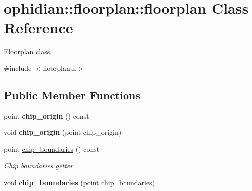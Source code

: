 \hypertarget{classophidian_1_1floorplan_1_1floorplan}{\section{ophidian\-:\-:floorplan\-:\-:floorplan Class Reference}
\label{classophidian_1_1floorplan_1_1floorplan}
}


Floorplan class.  




{\ttfamily \#include $<$floorplan.\-h$>$}

\subsection*{Public Member Functions}
\begin{DoxyCompactItemize}
\item 
\hypertarget{classophidian_1_1floorplan_1_1floorplan_ad44e227766842eacafce626a40ba06d8}{point {\bfseries chip\-\_\-origin} () const }\label{classophidian_1_1floorplan_1_1floorplan_ad44e227766842eacafce626a40ba06d8}

\item 
\hypertarget{classophidian_1_1floorplan_1_1floorplan_acad5b39db9aaae53a5c01b87faf8d571}{void {\bfseries chip\-\_\-origin} (point chip\-\_\-origin)}\label{classophidian_1_1floorplan_1_1floorplan_acad5b39db9aaae53a5c01b87faf8d571}

\item 
point \hyperlink{classophidian_1_1floorplan_1_1floorplan_a382fe697a6d6166b0cfb945de1f8ff70}{chip\-\_\-boundaries} () const 
\begin{DoxyCompactList}\small\item\em Chip boundaries getter. \end{DoxyCompactList}\item 
\hypertarget{classophidian_1_1floorplan_1_1floorplan_a802766d807b6eb9d4832e74b96d3551a}{void {\bfseries chip\-\_\-boundaries} (point chip\-\_\-boundaries)}\label{classophidian_1_1floorplan_1_1floorplan_a802766d807b6eb9d4832e74b96d3551a}


\end{DoxyCompactItemize}
